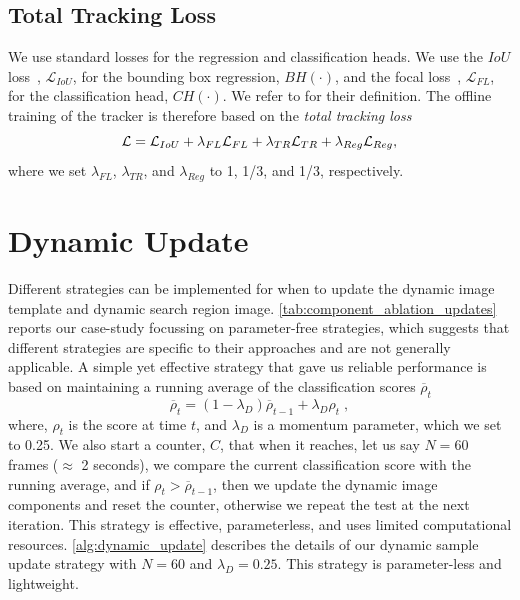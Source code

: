 \subsection{Total Tracking Loss} 
We use standard losses for the regression and classification heads. We use the $IoU$ loss~\cite{rezatofighi2019generalized}, $\mathcal{L}_{IoU}$, for the bounding box regression, $BH(\cdot)$, and the focal loss~\cite{lin2017focal}, $\mathcal{L}_{FL}$, for the classification head, $CH(\cdot)$. We refer to \cite{rezatofighi2019generalized,lin2017focal} for their definition.
The offline training of the tracker is therefore based on the \emph{total tracking loss}
\begin{equation} \small
  \centering
  \label{eq:overall_loss}
          \mathcal{L} =  \mathcal{L}_{IoU} + \lambda_{FL} \mathcal{L}_{FL} + \lambda_{TR} \mathcal{L}_{TR} + \lambda_{Reg} \mathcal{L}_{Reg},
\end{equation}
where we set $\lambda_{FL}$, $\lambda_{TR}$, and $\lambda_{Reg}$ to 1, 1/3, and 1/3, respectively.

\section{Dynamic Update} \label{sec:methods_update} 
Different strategies can be implemented for when to update the dynamic image template and dynamic search region image. \ref{tab:component_ablation_updates} reports our case-study focussing on parameter-free strategies, which suggests that different strategies are specific to their approaches and are not generally applicable. A simple yet effective strategy that gave us reliable performance is based on maintaining a running average of the classification scores $\overline{\rho }_t$
\begin{equation}
  \label{eq:sample_update}
          \overline{\rho }_t = (1-{\lambda}_{D}) \overline{\rho}_{t-1} +  {\lambda}_{D} {\rho}_t \; ,
\end{equation}
where, ${\rho}_t$ is the score at time $t$, and ${\lambda}_{D}$ is a momentum parameter, which we set to 0.25. We also start a counter, $C$, that when it reaches, let us say $N=60$ frames ($\approx$ 2 seconds), we compare the current classification score with the running average, and if ${\rho}_t > \overline{\rho }_{t-1}$, then we update the dynamic image components and reset the counter, otherwise we repeat the test at the next iteration. This strategy is effective, parameterless, and uses limited computational resources. \ref{alg:dynamic_update} describes the details of our dynamic sample update strategy with $N=60$ and ${\lambda}_{D} = 0.25$. This strategy is parameter-less and lightweight.

